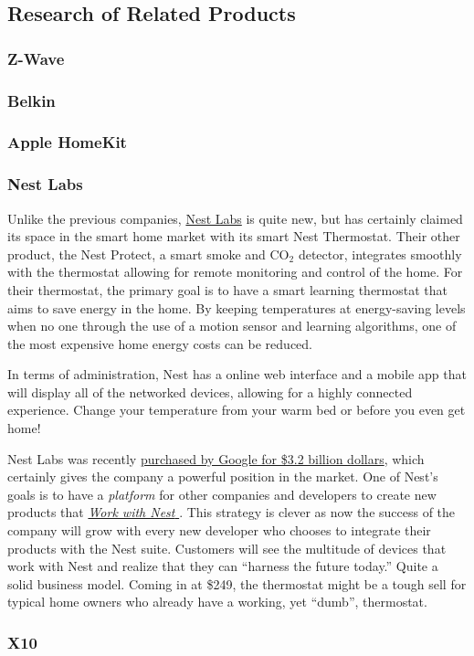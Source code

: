 \subsection{Research of Related Products}

\subsubsection{Z-Wave}

\subsubsection{Belkin}

\subsubsection{Apple HomeKit}

\subsubsection{Nest Labs}
Unlike the previous companies, \href{http://nest.com}{Nest Labs} is quite new,
but has certainly claimed its space in the smart home market with its smart
Nest Thermostat. Their other product, the Nest Protect, a smart smoke and
CO$_2$ detector, integrates smoothly with the thermostat allowing for remote
monitoring and control of the home. For their thermostat, the primary goal is
to have a smart learning thermostat that aims to save energy in the home. By
keeping temperatures at energy-saving levels when no one through the use of a
motion sensor and learning algorithms, one of the most expensive home energy
costs can be reduced.

In terms of administration, Nest has a online web interface and a mobile app
that will display all of the networked devices, allowing for a highly connected
experience. Change your temperature from your warm bed or before you even get home!

Nest Labs was recently
\href{http://www.forbes.com/sites/greatspeculations/2014/01/17/googles-strategy-behind-the-3-2-billion-acquisition-of-nest-labs/}{purchased by Google for \$3.2 billion dollars},
which certainly gives the company a powerful position in the market. One of
Nest's goals is to have a \emph{platform} for other companies and developers to
create new products that \href{https://nest.com/works-with-nest/}{\emph{Work with Nest \texttrademark}}. This strategy is
clever as now the success of the company will grow with every new
developer who chooses to integrate their products with the Nest suite.
Customers will see the multitude of devices that work with Nest and realize
that they can ``harness the future today.'' Quite a solid business model.
Coming in at \$249, the thermostat might be a tough sell for typical home owners who
already have a working, yet ``dumb'', thermostat.

\subsubsection{X10}

